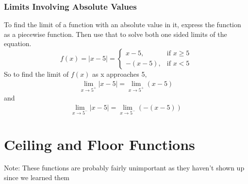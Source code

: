 \documentclass{article}
\begin{document}
        \subsubsection{Limits Involving Absolute Values}
            To find the limit of a function with an absolute value in it, express the function as a piecewise function. Then use that to solve both one sided limits of the equation.
            \[ f(x) = |x - 5| = 
                \begin{cases}
                    x-5, & \text{if } x \geq 5\\
                    -(x-5), & \text{if } x < 5
                \end{cases}
            \]
            So to find the limit of \(f(x)\) as x approaches 5,
            \begin{gather*}
                \lim_{x\to5^+}|x-5| = \lim_{x\to5^+}(x-5)
            \end{gather*}
            and
            \begin{gather*}
                \lim_{x\to5^-}|x-5| = \lim_{x\to5^-}(-(x-5))
            \end{gather*}
\section{Ceiling and Floor Functions}
Note: These functions are probably fairly unimportant as they haven't shown up since we learned them
\end{document}
